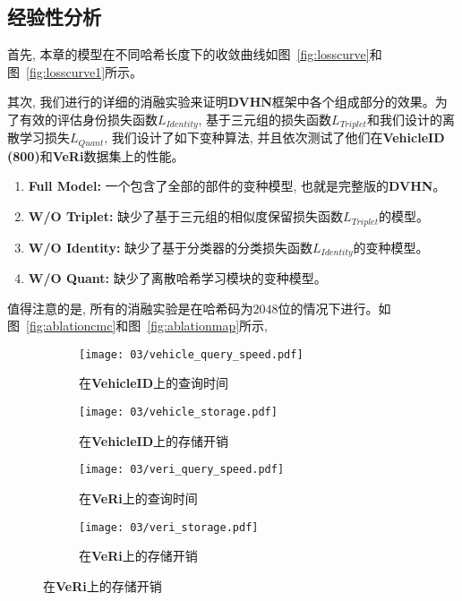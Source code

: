 \subsection{经验性分析}
首先, 本章的模型在不同哈希长度下的收敛曲线如图~\ref{fig:losscurve}和图~\ref{fig:losscurve1}所示。\par
其次, 我们进行的详细的消融实验来证明\textbf{DVHN}框架中各个组成部分的效果。为了有效的评估身份损失函数$L_{Identity}$, 基于三元组的损失函数$L_{Triplet}$和我们设计的离散学习损失$L_{Quant}$, 我们设计了如下变种算法, 并且依次测试了他们在\textbf{VehicleID (800)}和\textbf{VeRi}数据集上的性能。
\begin{enumerate}
    \item \textbf{Full Model:} 一个包含了全部的部件的变种模型, 也就是完整版的\textbf{DVHN}。
    \item \textbf{W/O Triplet:} 缺少了基于三元组的相似度保留损失函数$L_{Triplet}$的模型。 
    \item  \textbf{W/O Identity:} 缺少了基于分类器的分类损失函数$L_{Identity}$的变种模型。
    \item \textbf{W/O Quant:} 缺少了离散哈希学习模块的变种模型。
\end{enumerate}
值得注意的是, 所有的消融实验是在哈希码为$2048$位的情况下进行。如图~\ref{fig:ablationcmc}和图~\ref{fig:ablationmap}所示, 
\begin{figure}[!htp]
    \centering
    \begin{subfigure}{\textwidth}
      \centering
      \texttt{[image: 03/vehicle\_query\_speed.pdf]}
      \caption{在\textbf{VehicleID}上的查询时间}
    \end{subfigure}
    \hspace{1cm}
    \begin{subfigure}{\textwidth}
      \centering
      \texttt{[image: 03/vehicle\_storage.pdf]}
      \caption{在\textbf{VehicleID}上的存储开销}
    \end{subfigure}
    \begin{subfigure}{\textwidth}
        \centering
        \texttt{[image: 03/veri\_query\_speed.pdf]}
        \caption{在\textbf{VeRi}上的查询时间}
      \end{subfigure}
      \begin{subfigure}{\textwidth}
        \centering
        \texttt{[image: 03/veri\_storage.pdf]}
        \caption{在\textbf{VeRi}上的存储开销}
      \end{subfigure}
    \label{fig:sttcost}
  \end{figure}
